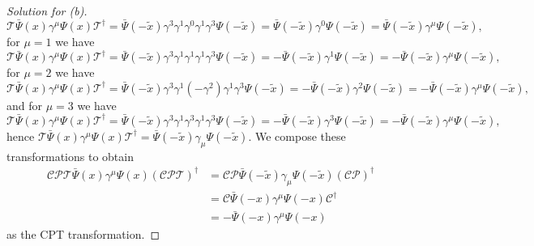 \begin{proof}[Solution for (b)]
   \begin{equation*}
       \mathscr{T} \bar{\Psi}(x) \gamma^\mu \Psi(x) \mathscr{T}^\dag = \bar{\Psi}(- \tilde{x}) \gamma^3 \gamma^1 \gamma^0 \gamma^1 \gamma^3 \Psi(- \tilde{x}) = \bar{\Psi}(- \tilde{x}) \gamma^0 \Psi(- \tilde{x}) = \bar{\Psi}(- \tilde{x}) \gamma^\mu \Psi(- \tilde{x}),
   \end{equation*}
   for \(\mu = 1\) we have
   \begin{equation*}
       \mathscr{T} \bar{\Psi}(x) \gamma^\mu \Psi(x) \mathscr{T}^\dag = \bar{\Psi}(- \tilde{x}) \gamma^3 \gamma^1 \gamma^1 \gamma^1 \gamma^3 \Psi(- \tilde{x}) = -\bar{\Psi}(- \tilde{x}) \gamma^1 \Psi(- \tilde{x}) = -\bar{\Psi}(- \tilde{x}) \gamma^\mu \Psi(- \tilde{x}),
   \end{equation*}
   for \(\mu = 2\) we have
   \begin{equation*}
       \mathscr{T} \bar{\Psi}(x) \gamma^\mu \Psi(x) \mathscr{T}^\dag = \bar{\Psi}(- \tilde{x}) \gamma^3 \gamma^1 (-\gamma^2) \gamma^1 \gamma^3 \Psi(- \tilde{x}) = -\bar{\Psi}(- \tilde{x}) \gamma^2 \Psi(- \tilde{x}) = -\bar{\Psi}(- \tilde{x}) \gamma^\mu \Psi(- \tilde{x}),
   \end{equation*}
   and for \(\mu = 3\) we have 
   \begin{equation*}
       \mathscr{T} \bar{\Psi}(x) \gamma^\mu \Psi(x) \mathscr{T}^\dag = \bar{\Psi}(- \tilde{x}) \gamma^3 \gamma^1 \gamma^3 \gamma^1 \gamma^3 \Psi(- \tilde{x}) = -\bar{\Psi}(- \tilde{x}) \gamma^3 \Psi(- \tilde{x}) = -\bar{\Psi}(- \tilde{x}) \gamma^\mu \Psi(- \tilde{x}),
   \end{equation*}
   hence \(\mathscr{T} \bar{\Psi}(x) \gamma^\mu \Psi(x) \mathscr{T}^\dag = \bar{\Psi}(- \tilde{x}) \gamma_\mu \Psi(- \tilde{x})\). We compose these transformations to obtain
   \begin{align*}
      \mathscr{CPT} \bar{\Psi}(x) \gamma^\mu \Psi(x)(\mathscr{CPT})^\dag &= \mathscr{CP} \bar{\Psi}(- \tilde{x}) \gamma_\mu \Psi(- \tilde{x}) (\mathscr{CP})^\dag\\
                                                                         &= \mathscr{C} \bar{\Psi}(-x) \gamma^\mu \Psi(-x) \mathscr{C}^\dag\\
                                                                         &= - \bar{\Psi}(-x) \gamma^\mu \Psi(-x)
   \end{align*}
   as the CPT transformation.
\end{proof}
